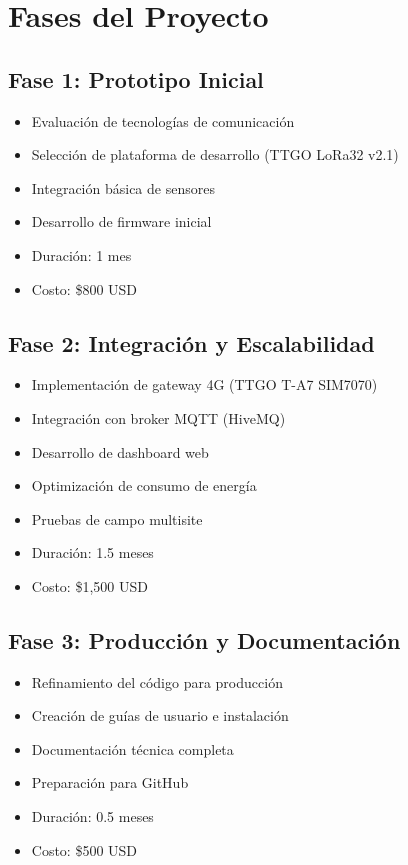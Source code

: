 \documentclass[12pt,a4paper,oneside]{report}
\begin{document}
\section{Fases del Proyecto}

\subsection{Fase 1: Prototipo Inicial}

\begin{itemize}
    \item Evaluación de tecnologías de comunicación
    \item Selección de plataforma de desarrollo (TTGO LoRa32 v2.1)
    \item Integración básica de sensores
    \item Desarrollo de firmware inicial
    \item Duración: 1 mes
    \item Costo: \$800 USD
\end{itemize}

\subsection{Fase 2: Integración y Escalabilidad}

\begin{itemize}
    \item Implementación de gateway 4G (TTGO T-A7 SIM7070)
    \item Integración con broker MQTT (HiveMQ)
    \item Desarrollo de dashboard web
    \item Optimización de consumo de energía
    \item Pruebas de campo multisite
    \item Duración: 1.5 meses
    \item Costo: \$1,500 USD
\end{itemize}

\subsection{Fase 3: Producción y Documentación}

\begin{itemize}
    \item Refinamiento del código para producción
    \item Creación de guías de usuario e instalación
    \item Documentación técnica completa
    \item Preparación para GitHub
    \item Duración: 0.5 meses
    \item Costo: \$500 USD
\end{itemize}
\end{document}
